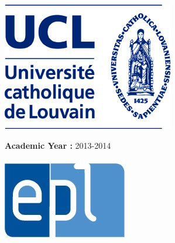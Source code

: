 \vfill
\begin{center}
\begin{minipage}{0.25\textwidth}
\begin{flushleft}
\includegraphics[scale=0.25]{Pictures/ucl-logo.jpg}
\end{flushleft}
\end{minipage}
\begin{minipage}{0.48\textwidth}
\begin{center}
\Large{\textbf{Academic Year :} 2013-2014}
\end{center}
\end{minipage}
\begin{minipage}{0.25\textwidth}
\begin{flushright}
\includegraphics[scale=0.5]{Pictures/epl-logo.jpg}
\end{flushright}
\end{minipage}
\end{center}